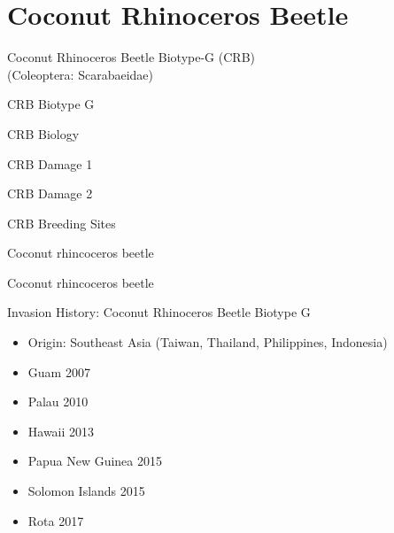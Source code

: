 \documentclass[]{beamer}
\begin{document}



\section{Coconut Rhinoceros Beetle}

\begin{frame}{Coconut Rhinoceros Beetle Biotype-G (CRB)\\(Coleoptera: Scarabaeidae)}
\end{frame}

\begin{frame}{CRB Biotype G}
\end{frame}

\begin{frame}{CRB Biology}
\end{frame}

\begin{frame}{CRB Damage 1}
\end{frame}

\begin{frame}{CRB Damage 2}
\end{frame}

\begin{frame}{CRB Breeding Sites}
\end{frame}

\begin{frame}{Coconut rhincoceros beetle}
\end{frame}

\begin{frame}{Coconut rhincoceros beetle}
\end{frame}


\begin{frame}{Invasion History: Coconut Rhinoceros Beetle Biotype G}
	\begin{itemize}
		\item Origin: Southeast Asia (Taiwan, Thailand, Philippines, Indonesia)
		\item Guam 2007
		\item Palau 2010
		\item Hawaii 2013
		\item Papua New Guinea 2015
		\item Solomon Islands 2015
		\item Rota 2017
	\end{itemize}
\end{frame}
\end{document}
